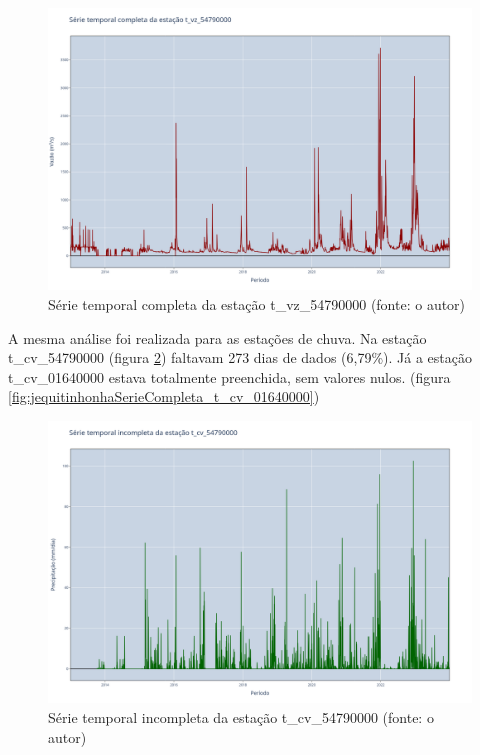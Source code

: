 \begin{figure}[!h]
\centering
\includegraphics[scale=0.25]{Figuras/jequiti/jequitinhonhaSerieCompleta_t_vz_54790000.png}
\caption{Série temporal completa da estação t\_vz\_54790000 (fonte: o autor)}
\label{fig:jequitinhonhaSerieCompleta_t_vz_54790000}
\end{figure}

A mesma análise foi realizada para as estações de chuva. Na estação t\_cv\_54790000 (figura \ref{fig:jequitinhonhaSerieIncompleta_t_cv_54790000}) faltavam 273 dias de dados (6,79\%). Já a estação t\_cv\_01640000 estava totalmente preenchida, sem valores nulos. (figura \ref{fig:jequitinhonhaSerieCompleta_t_cv_01640000})

\begin{figure}[!h]
\centering
\includegraphics[scale=0.25]{Figuras/jequiti/jequitinhonhaSerieIncompleta_t_cv_54790000.png}
\caption{Série temporal incompleta da estação t\_cv\_54790000 (fonte: o autor)}
\label{fig:jequitinhonhaSerieIncompleta_t_cv_54790000}
\end{figure}

